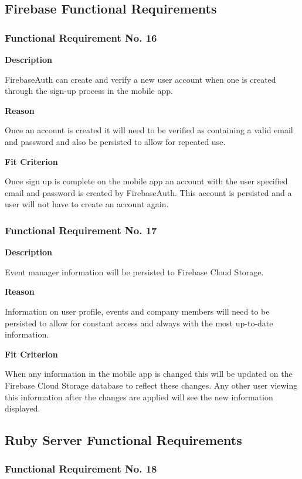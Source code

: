\subsection{Firebase Functional Requirements}

\subsubsection{Functional Requirement No. 16}

\textbf{Description}

FirebaseAuth can create and verify a new user account when one is created through the sign-up process in the mobile app.

\textbf{Reason}

Once an account is created it will need to be verified as containing a valid email and password and also be persisted to allow for repeated use.

\textbf{Fit Criterion}

Once sign up is complete on the mobile app an account with the user specified email and password is created by FirebaseAuth. This account is persisted and a user will not have to create an account again.

\subsubsection{Functional Requirement No. 17}

\textbf{Description}

Event manager information will be persisted to Firebase Cloud Storage.

\textbf{Reason}

Information on user profile, events and company members will need to be persisted to allow for constant access and always with the most up-to-date information.

\textbf{Fit Criterion}

When any information in the mobile app is changed this will be updated on the Firebase Cloud Storage database to reflect these changes. Any other user viewing this information after the changes are applied will see the new information displayed.

\subsection{Ruby Server Functional Requirements}

\subsubsection{Functional Requirement No. 18}

